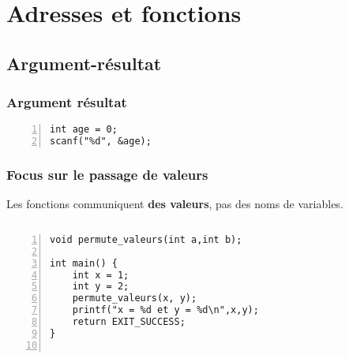 \documentclass[xcolor=pdftex,svgnames,table]{beamer}
\begin{document}
\section{Adresses et fonctions}
\subsection{Argument-résultat}
\begin{frame}[fragile]
  \frametitle{Argument résultat}

\begin{lstlisting}[numbers=left,basicstyle=\ttfamily\small]
int age = 0;
scanf("%d", &age);
\end{lstlisting}
\end{frame}


\begin{frame}[fragile,label=current1]
  \frametitle{Focus sur le passage de valeurs}
  Les fonctions communiquent \textbf{des valeurs}, pas des noms de
  variables.
\begin{columns}
\scriptsize
  \begin{column}[t]{3.7cm}
 \begin{lstlisting}[numbers=left,basicstyle=\ttfamily\scriptsize]
void permute_valeurs(int a,int b);

int main() {
    int x = 1;
    int y = 2;
    permute_valeurs(x, y);
    printf("x = %d et y = %d\n",x,y);
    return EXIT_SUCCESS;
}


\end{lstlisting}
\end{column}
\end{columns}
\end{frame}
\end{document}
